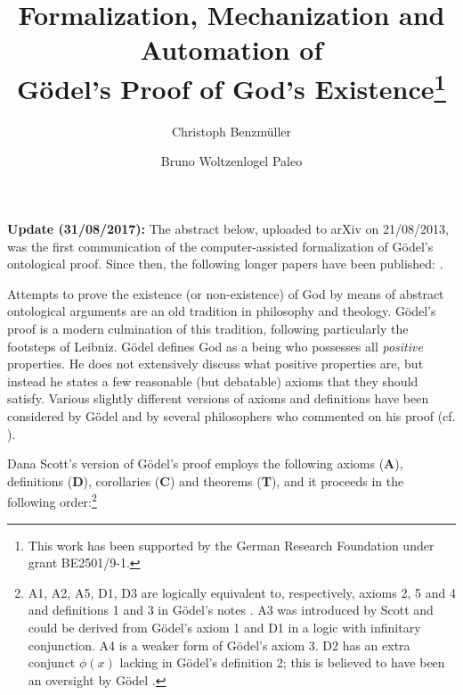 \documentclass{llncs}
\title{Formalization, Mechanization and Automation %
  of \\ G\"{o}del's Proof of God's Existence\thanks{This work has been
    supported by the German Research Foundation under grant
    BE2501/9-1.}}
\author{
  Christoph Benzm\"{u}ller\inst{1} 
  \and 
  Bruno Woltzenlogel Paleo\inst{2}
}
\institute{
  Dahlem Center for Intelligent Systems, Freie Universit\"{a}t Berlin, Germany\\
  \email{c.benzmueller@gmail.com}
  \and 
  Theory and Logic Group, Vienna University of Technology, Austria \\
  \email{bruno@logic.at}
}
\begin{document}
\maketitle

\bigskip

\noindent
\textbf{Update (31/08/2017):} The abstract below, uploaded to arXiv on
21/08/2013, was the first communication of the computer-assisted
formalization of G\"odel's ontological proof. Since then, the
following longer papers have been published:
\cite{W50,J28,B15,C39,C40,C41,C42,C44,C46,C52,W55,J32,C55,C60,B16,B66,J35,J36,C65}.

\bigskip
\bigskip

Attempts to prove the existence (or non-existence) of God by means of
abstract ontological arguments are an old tradition in philosophy and
theology.  G\"{o}del's proof \cite{Goedel1970,GoedelNotes} is a modern culmination of
this tradition, following particularly the footsteps of Leibniz.
%
G\"{o}del defines God as a being who possesses all \emph{positive} properties.
He does not extensively discuss what positive properties are, 
but instead he states a few reasonable (but debatable) axioms that they should satisfy.
Various slightly different versions of axioms and definitions have
been considered by G\"{o}del and by several philosophers who commented
on his proof
(cf. \cite{sobel2004logic,AndersonGettings,Fitting,Adams,ContemporaryBibliography}). 

Dana Scott's version of G\"odel's proof \cite{ScottNotes} employs the
following axioms (\textbf{A}), definitions (\textbf{D}), corollaries
(\textbf{C}) and theorems (\textbf{T}), and it proceeds in the
following order:\footnote{ A1, A2, A5, D1, D3 are logically
  equivalent to, respectively, axioms 2, 5 and 4 and definitions 1 and
  3 in G\"odel's notes \cite{Goedel1970,GoedelNotes}. 
  A3 was introduced by Scott \cite{ScottNotes} and 
  could be derived from G\"odel's axiom 1 and
  D1 in a logic with infinitary conjunction. 
  A4 is a weaker form of G\"odel's axiom 3. 
  D2 has an extra conjunct $\phi(x)$ lacking in G\"odel's definition 2; 
  this is believed to have been 
  an oversight by G\"odel \cite{Hazen}.}
\end{document}
